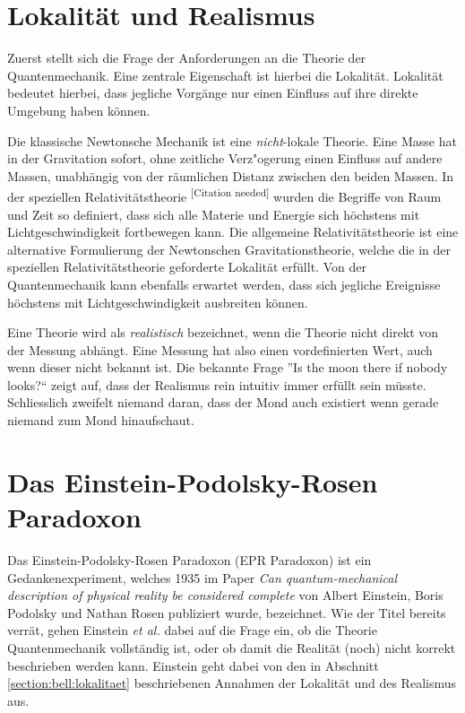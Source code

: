 \begin{refsection}
\section{Lokalit\"at und Realismus\label{section:bell:lokalitaet}}
Zuerst stellt sich die Frage der Anforderungen an die Theorie der
Quantenmechanik. Eine zentrale Eigenschaft ist hierbei die Lokalit\"at.
Lokalit\"at bedeutet hierbei, dass jegliche Vorg\"ange nur einen Einfluss
auf ihre direkte Umgebung haben k\"onnen.

Die klassische Newtonsche Mechanik ist eine \emph{nicht}-lokale 
Theorie. Eine Masse hat in der Gravitation sofort, ohne zeitliche 
Verz"ogerung einen Einfluss auf andere Massen, unabh\"angig von der
r\"aumlichen Distanz zwischen den beiden Massen. 
In der speziellen Relativit\"atstheorie 
\textsuperscript{[Citation needed]}
wurden die Begriffe von Raum und Zeit so definiert, dass sich alle
Materie und Energie sich h\"ochstens mit Lichtgeschwindigkeit fortbewegen
kann. 
Die allgemeine Relativit\"atstheorie ist eine alternative Formulierung
der Newtonschen Gravitationstheorie, welche die in der speziellen
Relativit\"atstheorie geforderte Lokalit\"at erf\"ullt.
Von der Quantenmechanik kann ebenfalls erwartet werden, dass sich
jegliche Ereignisse h\"ochstens mit Lichtgeschwindigkeit ausbreiten
k\"onnen.

Eine Theorie wird als \emph{realistisch} bezeichnet, wenn die Theorie
nicht direkt von der Messung abh\"angt. Eine Messung hat also einen
vordefinierten Wert, auch wenn dieser nicht bekannt ist.
Die bekannte Frage ''Is the moon there if nobody looks?{``} zeigt auf,
dass der Realismus rein intuitiv immer erf\"ullt sein m\"usste. Schliesslich
zweifelt niemand daran, dass der Mond auch existiert wenn gerade niemand
zum Mond hinaufschaut.

\section{Das Einstein-Podolsky-Rosen Paradoxon}
Das Einstein-Podolsky-Rosen Paradoxon (EPR Paradoxon) ist ein 
Gedankenexperiment, welches 1935 im Paper \cite{Einstein1935}
\emph{Can quantum-mechanical description of physical reality be considered complete}
von Albert Einstein, Boris Podolsky und Nathan Rosen publiziert wurde,
bezeichnet.
Wie der Titel bereits verr\"at, gehen Einstein \emph{et al.} dabei auf
die Frage ein, ob die Theorie Quantenmechanik vollständig ist, oder
ob damit die Realit\"at (noch) nicht korrekt beschrieben werden kann.
Einstein geht dabei von den in Abschnitt \ref{section:bell:lokalitaet}
beschriebenen Annahmen der Lokalit\"at und des Realismus aus.


\end{refsection}
